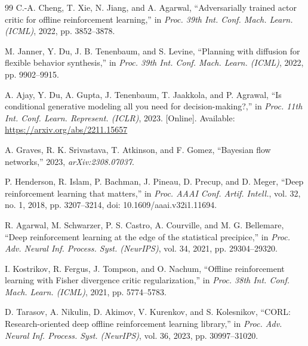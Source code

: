 \documentclass[conference]{IEEEtran}
\begin{document}
\begin{thebibliography}{99}
C.-A. Cheng, T. Xie, N. Jiang, and A. Agarwal, ``Adversarially trained actor critic for offline reinforcement learning,'' in \emph{Proc. 39th Int. Conf. Mach. Learn. (ICML)}, 2022, pp. 3852--3878.

M. Janner, Y. Du, J. B. Tenenbaum, and S. Levine, ``Planning with diffusion for flexible behavior synthesis,'' in \emph{Proc. 39th Int. Conf. Mach. Learn. (ICML)}, 2022, pp. 9902--9915.

A. Ajay, Y. Du, A. Gupta, J. Tenenbaum, T. Jaakkola, and P. Agrawal, ``Is conditional generative modeling all you need for decision-making?,'' in \emph{Proc. 11th Int. Conf. Learn. Represent. (ICLR)}, 2023. [Online]. Available: \url{https://arxiv.org/abs/2211.15657}

A. Graves, R. K. Srivastava, T. Atkinson, and F. Gomez, ``Bayesian flow networks,'' 2023, \emph{arXiv:2308.07037}.

P. Henderson, R. Islam, P. Bachman, J. Pineau, D. Precup, and D. Meger, ``Deep reinforcement learning that matters,'' in \emph{Proc. AAAI Conf. Artif. Intell.}, vol. 32, no. 1, 2018, pp. 3207--3214, doi: 10.1609/aaai.v32i1.11694.

R. Agarwal, M. Schwarzer, P. S. Castro, A. Courville, and M. G. Bellemare, ``Deep reinforcement learning at the edge of the statistical precipice,'' in \emph{Proc. Adv. Neural Inf. Process. Syst. (NeurIPS)}, vol. 34, 2021, pp. 29304--29320.

I. Kostrikov, R. Fergus, J. Tompson, and O. Nachum, ``Offline reinforcement learning with Fisher divergence critic regularization,'' in \emph{Proc. 38th Int. Conf. Mach. Learn. (ICML)}, 2021, pp. 5774--5783.

D. Tarasov, A. Nikulin, D. Akimov, V. Kurenkov, and S. Kolesnikov, ``CORL: Research-oriented deep offline reinforcement learning library,'' in \emph{Proc. Adv. Neural Inf. Process. Syst. (NeurIPS)}, vol. 36, 2023, pp. 30997--31020.

\end{thebibliography}
\end{document}
